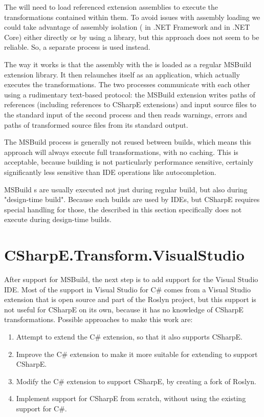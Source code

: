 The  will need to load referenced extension assemblies to execute the transformations contained within them. To avoid issues with assembly loading we could take advantage of assembly isolation ( in .NET Framework and  in .NET Core) either directly or by using a library, \cite{nb-msbe} but this approach does not seem to be reliable. So, a separate process is used instead.

The way it works is that the assembly with the  is loaded as a regular MSBuild extension library. It then relaunches itself as an application, which actually executes the transformations. The two processes communicate with each other using a rudimentary text-based protocol: the MSBuild extension writes paths of references (including references to CSharpE extensions) and input source files to the standard input of the second process and then reads warnings, errors and paths of transformed source files from its standard output.

\medskip

The MSBuild process is generally not reused between builds, which means this approach will always execute full transformations, with no caching. This is acceptable, because building is not particularly performance sensitive, certainly significantly less sensitive than \ac{IDE} operations like autocompletion.

MSBuild s are usually executed not just during regular build, but also during "design-time build". \cite{design-time-builds} Because such builds are used by \acp{IDE}, but CSharpE requires special handling for those, the  described in this section specifically does not execute during design-time builds.

\section{CSharpE.Transform.VisualStudio}

After support for MSBuild, the next step is to add support for the Visual Studio \ac{IDE}. Most of the support in Visual Studio for C\# comes from a Visual Studio extension that is open source and part of the Roslyn project, but this support is not useful for CSharpE on its own, because it has no knowledge of CSharpE transformations. Possible approaches to make this work are:

\begin{enumerate}
\item Attempt to extend the C\# extension, so that it also supports CSharpE.
\item Improve the C\# extension to make it more suitable for extending to support CSharpE.
\item Modify the C\# extension to support CSharpE, by creating a fork of Roslyn.
\item Implement support for CSharpE from scratch, without using the existing support for C\#.
\end{enumerate}

